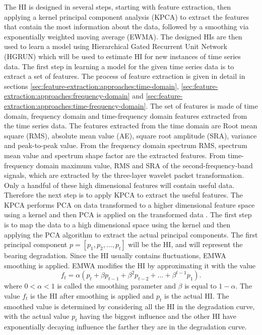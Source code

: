 The HI is designed in several steps, starting with feature extraction, then applying a kernel principal component analysis (KPCA) to
extract the features that contain the most information about the data, followed by a smoothing via exponentially weighted moving
average (EWMA). The designed HIs are then used to learn a model using Hierarchical Gated Recurrent Unit Network (HGRUN)
which will be used to estimate HI for new instances of
time series data.
The first step in learning a model for the given time series data is to extract a set of features.
The process of feature extraction is given in detail in sections \ref{sec:feature-extraction:approaches:time-domain},
\ref{sec:feature-extraction:approaches:frequency-domain} and \ref{sec:feature-extraction:approaches:time-frequency-domain}.
The set of features is made of time domain, frequency domain and time-frequency domain features extracted from the time series data.
The features extracted from the time domain are Root mean square (RMS), absolute mean value (AE), square
root amplitude (SRA), variance and peak-to-peak value. From the frequency domain spectrum RMS, spectrum mean value and spectrum shape
factor are the extracted features. From time-frequency domain maximum value, RMS and SRA of the second-frequency-band signals, which are extracted
by the three-layer wavelet packet transformation. Only a handful of these high dimensional features will contain useful data. Therefore
the next step is to apply KPCA to extract the useful features. The KPCA performs PCA on data transformed to a higher dimensional feature space using
a kernel and then PCA is applied on the transformed data \cite{MohriFML}. The first step is to
map the data to a high dimensional space using the kernel and then applying the PCA algorithm to extract the actual principal components.
The first principal component $ p = [p_1,p_2,\dots,p_t]$ will be the HI, and will represent the bearing degradation. Since the HI
usually contains fluctuations, EMWA smoothing is applied. EMWA modifies the HI by approximating it with the value
\begin{equation}
    f_t = \alpha(p_t + \beta p_{t-1}+\beta^2p_{t-2}+\dots+\beta^{t-1}p_1).
\end{equation}
where $0< \alpha <1$ is called the smoothing parameter and $\beta$ is equal to $1-\alpha$. The value
$f_t$ is the HI after smoothing is applied and $p_t$ is the actual HI. The smoothed value is determined
by considering all the HI in the degradation curve, with the actual value $p_t$ having the biggest
influence and the other HI have exponentially decaying influence the farther they are in the degradation
curve.

